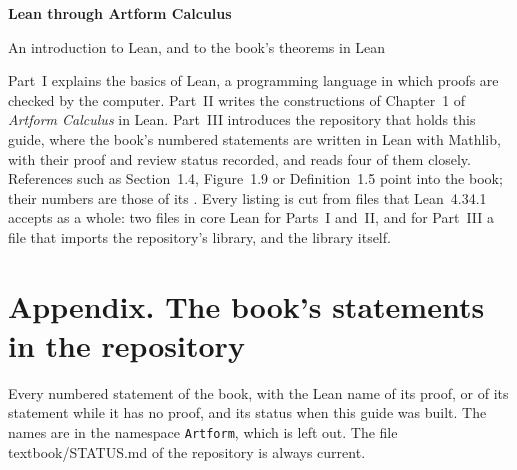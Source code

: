 \documentclass[12pt,openany]{memoir}
\newcommand{\li}{\lstinline[style=leaninline]}
\newcommand{\lc}[1]{{\ttfamily\small #1}}
\newcommand{\leanversion}{4.34.1}
\begin{document}
\pagestyle{plain}
\begin{center}
{\Huge\bfseries\color{ArtNavy} Lean through Artform Calculus\par}
\medskip
{\large An introduction to Lean, and to the book's theorems in Lean\par}
\end{center}
\bigskip

\noindent Part~I explains the basics of Lean, a programming language in which
proofs are checked by the computer. Part~II writes the constructions of
Chapter~1 of \emph{Artform Calculus} in Lean. Part~III introduces the
repository that holds this guide, where the book's numbered statements are
written in Lean with Mathlib, with their proof and review status recorded,
and reads four of them closely.
References such as Section~1.4, Figure~1.9 or Definition~1.5 point into the
book; their numbers are those of its \bookedition. Every listing is cut from
files that Lean~\leanversion{} accepts as a whole: two files in core Lean for
Parts~I and~II, and for Part~III a file that imports the repository's
library, and the library itself.

\begingroup
\setlength{\parskip}{0pt}
\renewcommand{\contentsname}{Contents}
\tableofcontents*
\endgroup
\clearpage

\clearpage

\clearpage

\clearpage
\chapter*{Appendix. The book's statements in the repository}
Every numbered statement of the book, with the Lean name of its proof, or of
its statement while it has no proof, and its status when this guide was
built. The names are in the namespace \li!Artform!, which is left out. The
file \lc{textbook/STATUS.md} of the repository is always current.
\medskip

{\small\statustable}


\end{document}
